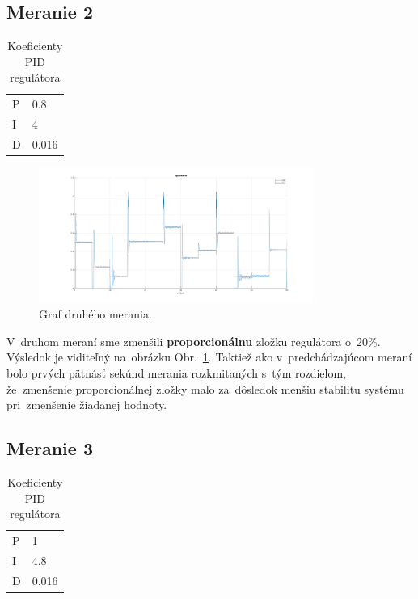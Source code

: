 \documentclass{article}
\begin{document}
\subsection{Meranie 2}
\label{sec:meranie2}

\begin{table}[!htbp]
	\caption{Koeficienty PID regulátora}
	\label{tab:t2}
	\begin{center}
		\begin{tabular}[c]{|l|l|}
			\hline
			P & 0.8 \\
			I & 4 \\
			D & 0.016 \\
			\hline
		\end{tabular}
	\end{center}
\end{table}

\begin{figure}[!htbp]
	\begin{center}
		\includegraphics[width=0.8\textwidth]{./include/m3.png}
	\end{center}
	\caption{Graf druhého merania.}
	\label{fig:meranie2}
\end{figure}

V~druhom meraní sme zmenšili \textbf{proporcionálnu} zložku regulátora o~20\%. Výsledok je viditeľný
na~obrázku Obr.~\ref{fig:meranie2}. Taktiež ako v~predchádzajúcom meraní bolo prvých pätnásť sekúnd
merania rozkmitaných s~tým rozdielom, že~zmenšenie proporcionálnej zložky malo za~dôsledok menšiu
stabilitu systému pri~zmenšenie žiadanej hodnoty.

\clearpage

\subsection{Meranie 3}
\label{sec:meranie3}

\begin{table}[!htbp]
	\caption{Koeficienty PID regulátora}
	\label{tab:t3}
	\begin{center}
		\begin{tabular}[c]{|l|l|}
			\hline
			P & 1 \\
			I & 4.8 \\
			D & 0.016 \\
			\hline
		\end{tabular}
	\end{center}
\end{table}
\end{document}
